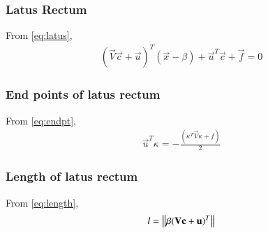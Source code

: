 \documentclass[journal,12pt,twocolumn]{IEEEtran}
\begin{document}
\subsubsection{Latus Rectum}
From \eqref{eq:latus},
\begin{align}
    (\vec{V}\vec{c}+\vec{u})^T(\vec{x} -\beta) + \vec{u}^T\vec{c} + \vec{f} = 0
\end{align}
\subsubsection{End points of latus rectum}
From \eqref{eq:endpt},
\begin{align}
    \vec{u}^T\kappa = -\frac{(\kappa^T\vec{V}\kappa + f )}{2}
\end{align}
\subsubsection{Length of latus rectum}
From \eqref{eq:length},
\begin{align}
   l=\left\lVert\beta(\mathbf{V}\mathbf{c}+\mathbf{u})^T\right\rVert 
\end{align}
\end{document}
